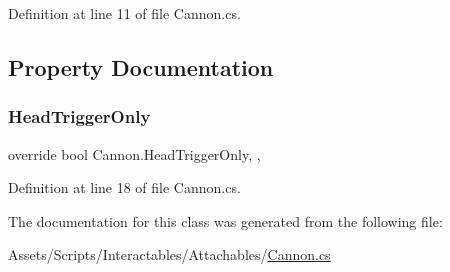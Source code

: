 Definition at line 11 of file Cannon.\+cs.



\subsection{Property Documentation}
\mbox{\label{class_cannon_ab764ca13d521eb8329aa9520e91842d4}} 
\subsubsection{\texorpdfstring{Head\+Trigger\+Only}{HeadTriggerOnly}}
{\footnotesize\ttfamily override bool Cannon.\+Head\+Trigger\+Only\hspace{0.3cm}{\ttfamily [get]}, {\ttfamily [set]}, {\ttfamily [protected]}}



Definition at line 18 of file Cannon.\+cs.



The documentation for this class was generated from the following file\+:\begin{DoxyCompactItemize}
\item 
Assets/\+Scripts/\+Interactables/\+Attachables/\mbox{\hyperlink{_cannon_8cs}{Cannon.\+cs}}\end{DoxyCompactItemize}
